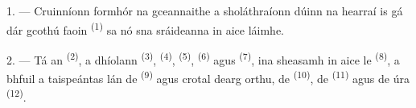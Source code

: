%
%
%

\VUsaut{4.0mm}
\VUsaut{3.0mm}

\VUsaut{3.0mm}

1. --- Cruinníonn formhór na gceannaithe a sholáthraíonn dúinn na hearraí is gá dár
gcothú faoin  \textsuperscript{(1)} sa  nó
sna sráideanna in aice láimhe.

2. --- Tá an  \textsuperscript{(2)}, a dhíolann
 \textsuperscript{(3)},  \textsuperscript{(4)},
 \textsuperscript{(5)},  \textsuperscript{(6)}
agus  \textsuperscript{(7)}, ina sheasamh in aice le  \textsuperscript{(8)}, a bhfuil a taispeántas lán de  \textsuperscript{(9)} agus crotal dearg orthu, de  \textsuperscript{(10)}, de  \textsuperscript{(11)}
agus de  úra \textsuperscript{(12)}.


